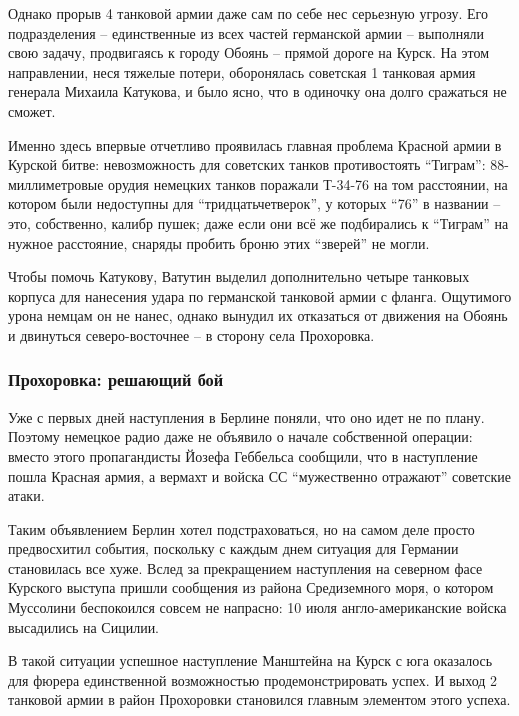 Однако прорыв 4 танковой армии даже сам по себе нес серьезную угрозу. Его
подразделения – единственные из всех частей германской армии – выполняли свою
задачу, продвигаясь к городу Обоянь – прямой дороге на Курск. На этом
направлении, неся тяжелые потери, оборонялась советская 1 танковая армия
генерала Михаила Катукова, и было ясно, что в одиночку она долго сражаться не
сможет.

Именно здесь впервые отчетливо проявилась главная проблема Красной армии в
Курской битве: невозможность для советских танков противостоять \enquote{Тиграм}:
88-миллиметровые орудия немецких танков поражали Т-34-76 на том расстоянии, на
котором были недоступны для \enquote{тридцатьчетверок}, у которых \enquote{76} в названии –
это, собственно, калибр пушек; даже если они всё же подбирались к \enquote{Тиграм} на
нужное расстояние, снаряды пробить броню этих \enquote{зверей} не могли.

Чтобы помочь Катукову, Ватутин выделил дополнительно четыре танковых корпуса
для нанесения удара по германской танковой армии с фланга. Ощутимого урона
немцам он не нанес, однако вынудил их отказаться от движения на Обоянь и
двинуться северо-восточнее – в сторону села Прохоровка.


\subsubsection{Прохоровка: решающий бой}

Уже с первых дней наступления в Берлине поняли, что оно идет не по плану.
Поэтому немецкое радио даже не объявило о начале собственной операции: вместо
этого пропагандисты Йозефа Геббельса сообщили, что в наступление пошла Красная
армия, а вермахт и войска СС \enquote{мужественно отражают} советские атаки.

Таким объявлением Берлин хотел подстраховаться, но на самом деле просто
предвосхитил события, поскольку с каждым днем ситуация для Германии становилась
все хуже. Вслед за прекращением наступления на северном фасе Курского выступа
пришли сообщения из района Средиземного моря, о котором Муссолини беспокоился
совсем не напрасно: 10 июля англо-американские войска высадились на Сицилии.

В такой ситуации успешное наступление Манштейна на Курск с юга оказалось для
фюрера единственной возможностью продемонстрировать успех. И выход 2 танковой
армии в район Прохоровки становился главным элементом этого успеха.

